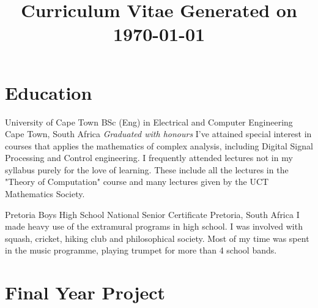 \documentclass[11pt,a4paper,sans]{moderncv}
\title{Curriculum Vitae \newline\null\hfill\small Generated on \today}
\begin{document}
\makecvtitle


\section{Education}

{University of Cape Town}
{BSc (Eng) in Electrical and Computer Engineering}
{\newline Cape Town, South Africa}
{\textit{Graduated with honours}}
{I've attained special interest in courses that applies the mathematics of complex
analysis, including Digital Signal Processing and Control engineering. I
frequently attended lectures not in my syllabus purely for the love of learning.
These include all the lectures in the "Theory of Computation" course and many
lectures given by the UCT Mathematics Society.}

\vspace{2mm}
{Pretoria Boys High School}
{National Senior Certificate}
{\newline Pretoria, South Africa}
{}
{I made heavy use of the extramural programs in high school. I was involved with
squash, cricket, hiking club and philosophical society. Most of my time was spent
in the music programme, playing trumpet for more than 4 school bands.}

\section{Final Year Project}
\end{document}
